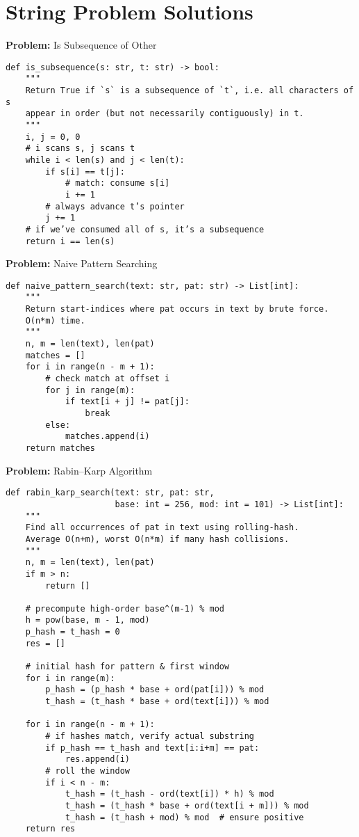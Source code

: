 \section*{String Problem Solutions}
\noindent\textbf{Problem:} Is Subsequence of Other
\begin{verbatim}
def is_subsequence(s: str, t: str) -> bool:
    """
    Return True if `s` is a subsequence of `t`, i.e. all characters of s
    appear in order (but not necessarily contiguously) in t.
    """
    i, j = 0, 0
    # i scans s, j scans t
    while i < len(s) and j < len(t):
        if s[i] == t[j]:
            # match: consume s[i]
            i += 1
        # always advance t’s pointer
        j += 1
    # if we’ve consumed all of s, it’s a subsequence
    return i == len(s)
\end{verbatim}
\noindent\textbf{Problem:} Naive Pattern Searching
\begin{verbatim}
def naive_pattern_search(text: str, pat: str) -> List[int]:
    """
    Return start-indices where pat occurs in text by brute force.
    O(n*m) time.
    """
    n, m = len(text), len(pat)
    matches = []
    for i in range(n - m + 1):
        # check match at offset i
        for j in range(m):
            if text[i + j] != pat[j]:
                break
        else:
            matches.append(i)
    return matches
\end{verbatim}
\noindent\textbf{Problem:} Rabin–Karp Algorithm
\begin{verbatim}
def rabin_karp_search(text: str, pat: str,
                      base: int = 256, mod: int = 101) -> List[int]:
    """
    Find all occurrences of pat in text using rolling‐hash.
    Average O(n+m), worst O(n*m) if many hash collisions.
    """
    n, m = len(text), len(pat)
    if m > n:
        return []

    # precompute high-order base^(m-1) % mod
    h = pow(base, m - 1, mod)
    p_hash = t_hash = 0
    res = []

    # initial hash for pattern & first window
    for i in range(m):
        p_hash = (p_hash * base + ord(pat[i])) % mod
        t_hash = (t_hash * base + ord(text[i])) % mod

    for i in range(n - m + 1):
        # if hashes match, verify actual substring
        if p_hash == t_hash and text[i:i+m] == pat:
            res.append(i)
        # roll the window
        if i < n - m:
            t_hash = (t_hash - ord(text[i]) * h) % mod
            t_hash = (t_hash * base + ord(text[i + m])) % mod
            t_hash = (t_hash + mod) % mod  # ensure positive
    return res
\end{verbatim}
